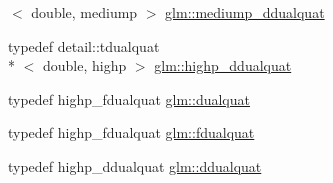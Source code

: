 \begin{DoxyCompactItemize}
$<$ double, mediump $>$ \hyperlink{group__gtc__dual__quaternion_ga62d8cbf30e2afd0b1044204268a69066}{glm\-::mediump\-\_\-ddualquat}
\item 
typedef detail\-::tdualquat\\*
$<$ double, highp $>$ \hyperlink{group__gtc__dual__quaternion_ga61b654c21f080135aedcf23461eb1037}{glm\-::highp\-\_\-ddualquat}
\item 
typedef highp\-\_\-fdualquat \hyperlink{group__gtc__dual__quaternion_ga2f6227b5f9dc08a2e7682065a84b3aa9}{glm\-::dualquat}
\item 
typedef highp\-\_\-fdualquat \hyperlink{group__gtc__dual__quaternion_ga436906129bc69ca5059555cafcbac9fd}{glm\-::fdualquat}
\item 
typedef highp\-\_\-ddualquat \hyperlink{group__gtc__dual__quaternion_ga373431ffdd82d5c03c258217a9e1f1a6}{glm\-::ddualquat}
\end{DoxyCompactItemize}

